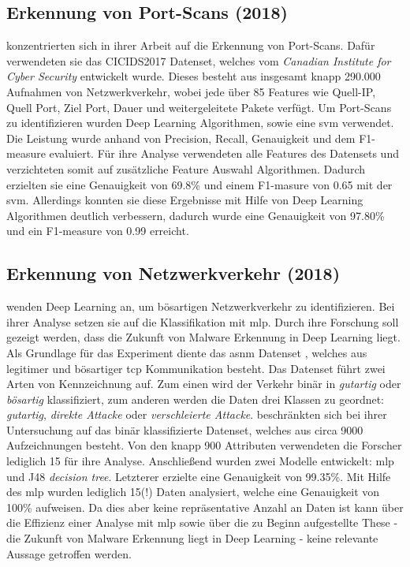 \documentclass[
    12pt, %
    DIV10,
    ngerman, %
    a4paper, %
    oneside, %
    titlepage, %
    parskip=half, %
    headings=normal, %
    listof=totoc, %
    bibliography=totoc, %
    index=totoc, %
    captions=tableheading, %
    final %
]{scrreprt}
\begin{document}
\subsection{Erkennung von Port-Scans (2018)}
\textcite{Aksu2019} konzentrierten sich in ihrer Arbeit auf die Erkennung von Port-Scans. Dafür verwendeten sie das CICIDS2017 Datenset, welches vom \emph{Canadian Institute for Cyber Security} entwickelt wurde. Dieses besteht aus insgesamt knapp 290.000 Aufnahmen von Netzwerkverkehr, wobei jede über 85 Features wie Quell-IP, Quell Port, Ziel Port, Dauer und weitergeleitete Pakete verfügt. Um Port-Scans zu identifizieren wurden Deep Learning Algorithmen, sowie eine \ac{svm} verwendet. Die Leistung wurde anhand von Precision, Recall, Genauigkeit und dem F1-measure evaluiert. Für ihre Analyse verwendeten  \textcite{Aksu2019} alle Features des Datensets und verzichteten somit auf zusätzliche Feature Auswahl Algorithmen. Dadurch erzielten sie eine Genauigkeit von 69.8\% und einem F1-masure von 0.65 mit der \ac{svm}. Allerdings  konnten sie diese Ergebnisse mit Hilfe von Deep Learning Algorithmen deutlich verbessern, dadurch wurde eine Genauigkeit von 97.80\% und ein F1-measure von 0.99 erreicht.
%
\subsection{Erkennung von Netzwerkverkehr (2018)}
\textcite{Teoh2018} wenden Deep Learning an, um bösartigen Netzwerkverkehr zu identifizieren. Bei ihrer Analyse setzen sie auf die Klassifikation mit \ac{mlp}. Durch ihre Forschung soll gezeigt werden, dass die Zukunft von Malware Erkennung in Deep Learning liegt. Als Grundlage für das Experiment diente das \ac{asnm} Datenset \parencite{homoliak2013asnm}, welches aus legitimer und bösartiger \ac{tcp} Kommunikation besteht. Das Datenset führt zwei Arten von Kennzeichnung auf. Zum einen wird der Verkehr binär in \emph{gutartig} oder \emph{bösartig} klassifiziert, zum anderen werden die Daten drei Klassen zu geordnet: \emph{gutartig}, \emph{direkte Attacke} oder \emph{verschleierte Attacke}. \textcite{Teoh2018} beschränkten sich bei ihrer Untersuchung auf das binär klassifizierte Datenset, welches aus circa 9000 Aufzeichnungen besteht. Von den knapp 900 Attributen verwendeten die Forscher lediglich 15 für ihre Analyse. Anschließend wurden zwei Modelle entwickelt: \ac{mlp} und J48 \emph{decision tree}. Letzterer erzielte eine Genauigkeit von 99.35\%. Mit Hilfe des \ac{mlp} wurden lediglich 15(!) Daten analysiert, welche eine Genauigkeit von 100\% aufweisen. Da dies aber keine repräsentative Anzahl an Daten ist kann über die Effizienz einer Analyse mit \ac{mlp} sowie über die zu Beginn aufgestellte These - die Zukunft von Malware Erkennung liegt in Deep Learning - keine relevante Aussage getroffen werden. 
%
\end{document}
